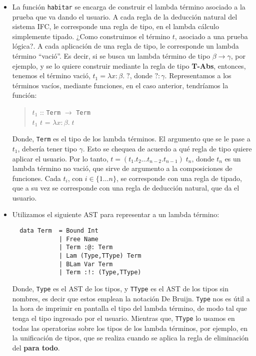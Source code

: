 \documentclass[a4paper,11pt]{article}
\begin{document}
\begin{itemize}
  \item La función \texttt{habitar} se encarga de construir el lambda término asociado a la prueba que va dando el usuario.
  A cada regla de la deducción natural del sistema IFC, le corresponde una regla de tipo, en el lambda cálculo simplemente
  tipado. ¿Como construimos el término $t$, asociado a una prueba lógica?.
  A cada aplicación de una regla de tipo, le corresponde un lambda término ``vació''.
  Es decir, si se busca un lambda término de tipo $\beta \rightarrow \gamma$, por ejemplo, y se lo quiere construir mediante la regla 
  de tipo \textbf{T-Abs}, entonces, tenemos el término vació, $t_{1} = \lambda x:\beta. \; ?$, donde $? : \gamma$.
  Representamos a los términos vacíos, mediante funciones, en el caso anterior, tendríamos la función:

  \begin{verse}
  $t_{1}$ :: \texttt{Term} $\rightarrow$  \texttt{Term} \\
  $t_{1}$ $t$ = $\lambda x:\beta. \; t$
  \end{verse}

  Donde, \texttt{Term} es el tipo de los lambda términos. El argumento que se le pase a $t_{1}$, debería tener tipo $\gamma$.
  Esto se chequea de acuerdo a qué regla de tipo quiere aplicar el usuario.
  Por lo tanto, $t = (t_{1} . t_{2} \dots t_{n-2} . t_{n-1}) \; t_{n}$, donde $t_{n}$ es un lambda término no vació, que sirve de argumento a la composiciones
  de funciones. Cada $t_{i}$, con $i \in \{ 1 \dots n \}$, se corresponde con una regla de tipado, que a su vez se corresponde con una regla de deducción natural, 
  que da el usuario.
  
  \item Utilizamos el siguiente AST para representar a un lambda término:
  \begin{verbatim}
  data Term  = Bound Int
             | Free Name 
             | Term :@: Term
             | Lam (Type,TType) Term
             | BLam Var Term
             | Term :!: (Type,TType)
  \end{verbatim}

  Donde, \texttt{Type} es el AST de los tipos, y \texttt{TType} es el AST de los tipos sin nombres, es decir que estos emplean la notación De Bruijn.
  \texttt{Type} nos es útil a la hora de imprimir en pantalla el tipo del lambda término, de modo tal que tenga el tipo ingresado por el usuario.
  Mientras que, \texttt{TType} lo usamos en todas las operatorias sobre los tipos de los lambda términos, por ejemplo, en la unificación de tipos, que
  se realiza cuando se aplica la regla de eliminación del \textbf{para todo}.
  

\end{itemize}
\end{document}
